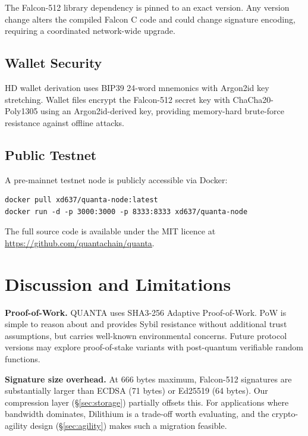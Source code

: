 \documentclass[11pt,a4paper]{article}
\begin{document}
The Falcon-512 library dependency is pinned to an exact version. Any version
change alters the compiled Falcon C code and could change signature encoding,
requiring a coordinated network-wide upgrade.

\subsection{Wallet Security}

HD wallet derivation uses BIP39 24-word mnemonics with Argon2id key
stretching. Wallet files encrypt the Falcon-512 secret key with
ChaCha20-Poly1305 using an Argon2id-derived key, providing memory-hard
brute-force resistance against offline attacks.


\subsection{Public Testnet}

A pre-mainnet testnet node is publicly accessible via Docker:

\begin{lstlisting}
docker pull xd637/quanta-node:latest
docker run -d -p 3000:3000 -p 8333:8333 xd637/quanta-node
\end{lstlisting}

The full source code is available under the MIT licence at
\url{https://github.com/quantachain/quanta}.


\section{Discussion and Limitations}

\textbf{Proof-of-Work.} QUANTA uses SHA3-256 Adaptive Proof-of-Work. PoW is
simple to reason about and provides Sybil resistance without additional trust
assumptions, but carries well-known environmental concerns. Future protocol
versions may explore proof-of-stake variants with post-quantum verifiable
random functions.

\textbf{Signature size overhead.} At 666 bytes maximum, Falcon-512 signatures
are substantially larger than ECDSA (71 bytes) or Ed25519 (64 bytes). Our
compression layer (\S\ref{sec:storage}) partially offsets this. For
applications where bandwidth dominates, Dilithium is a trade-off worth
evaluating, and the crypto-agility design (\S\ref{sec:agility}) makes such a
migration feasible.
\end{document}
